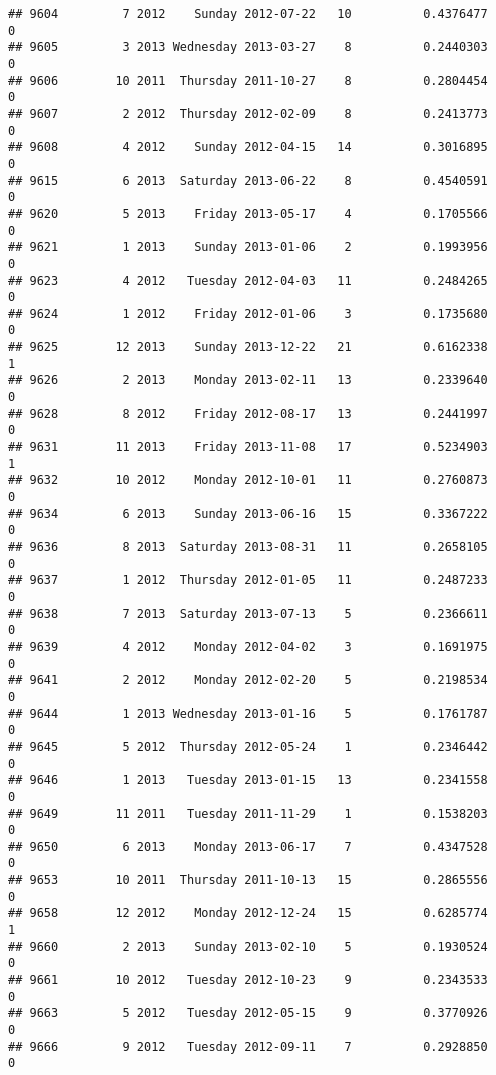 \documentclass[
]{article}
\begin{document}
\begin{verbatim}
## 9604         7 2012    Sunday 2012-07-22   10          0.4376477             0
## 9605         3 2013 Wednesday 2013-03-27    8          0.2440303             0
## 9606        10 2011  Thursday 2011-10-27    8          0.2804454             0
## 9607         2 2012  Thursday 2012-02-09    8          0.2413773             0
## 9608         4 2012    Sunday 2012-04-15   14          0.3016895             0
## 9615         6 2013  Saturday 2013-06-22    8          0.4540591             0
## 9620         5 2013    Friday 2013-05-17    4          0.1705566             0
## 9621         1 2013    Sunday 2013-01-06    2          0.1993956             0
## 9623         4 2012   Tuesday 2012-04-03   11          0.2484265             0
## 9624         1 2012    Friday 2012-01-06    3          0.1735680             0
## 9625        12 2013    Sunday 2013-12-22   21          0.6162338             1
## 9626         2 2013    Monday 2013-02-11   13          0.2339640             0
## 9628         8 2012    Friday 2012-08-17   13          0.2441997             0
## 9631        11 2013    Friday 2013-11-08   17          0.5234903             1
## 9632        10 2012    Monday 2012-10-01   11          0.2760873             0
## 9634         6 2013    Sunday 2013-06-16   15          0.3367222             0
## 9636         8 2013  Saturday 2013-08-31   11          0.2658105             0
## 9637         1 2012  Thursday 2012-01-05   11          0.2487233             0
## 9638         7 2013  Saturday 2013-07-13    5          0.2366611             0
## 9639         4 2012    Monday 2012-04-02    3          0.1691975             0
## 9641         2 2012    Monday 2012-02-20    5          0.2198534             0
## 9644         1 2013 Wednesday 2013-01-16    5          0.1761787             0
## 9645         5 2012  Thursday 2012-05-24    1          0.2346442             0
## 9646         1 2013   Tuesday 2013-01-15   13          0.2341558             0
## 9649        11 2011   Tuesday 2011-11-29    1          0.1538203             0
## 9650         6 2013    Monday 2013-06-17    7          0.4347528             0
## 9653        10 2011  Thursday 2011-10-13   15          0.2865556             0
## 9658        12 2012    Monday 2012-12-24   15          0.6285774             1
## 9660         2 2013    Sunday 2013-02-10    5          0.1930524             0
## 9661        10 2012   Tuesday 2012-10-23    9          0.2343533             0
## 9663         5 2012   Tuesday 2012-05-15    9          0.3770926             0
## 9666         9 2012   Tuesday 2012-09-11    7          0.2928850             0

\end{verbatim}
\end{document}
